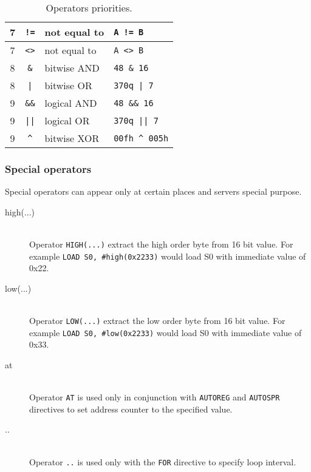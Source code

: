 \begin{table}[h!]
\begin{tabular}{|c|c|l|l|}
                7        & \texttt{!=}   & not equal to            & \texttt{A != B}           \\\hline
                7        & \texttt{<>}   & not equal to            & \texttt{A <> B}           \\\hline
                8        & \texttt{\&}   & bitwise AND             & \texttt{48 \& 16}          \\\hline
                8        & \texttt{|}    & bitwise OR              & \texttt{370q | 7}          \\\hline
                9        & \texttt{\&\&} & logical AND             & \texttt{48 \&\& 16}        \\\hline
                9        & \texttt{||}   & logical OR              & \texttt{370q || 7}         \\\hline
                9        & \texttt{\^{}} & bitwise XOR             & \texttt{00fh \^{} 005h}    \\\hline
            \end{tabular}
            \caption{Operators priorities.}
        \end{table}

        \subsubsection{Special operators}
            Special operators can appear only at certain places and servers special purpose.
            \begin{description}
                \item[high(...)]~\\
                    Operator \texttt{HIGH(...)} extract the high order byte from 16 bit value. For example \texttt{LOAD  S0, \#high(0x2233)} would load S0 with immediate value of 0x22.
                \item[low(...)]~\\
                    Operator \texttt{LOW(...)} extract the low order byte from 16 bit value. For example \texttt{LOAD  S0, \#low(0x2233)} would load S0 with immediate value of 0x33.
                \item[at]~\\
                    Operator \texttt{AT} is used only in conjunction with \texttt{AUTOREG} and \texttt{AUTOSPR} directives to set address counter to the specified value.
                \item[..]~\\
                    Operator \texttt{..} is used only with the \texttt{FOR} directive to specify loop interval.
            \end{description}

